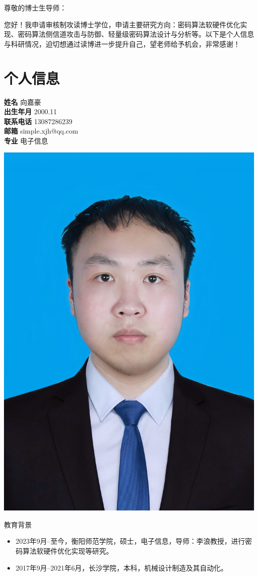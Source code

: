 \documentclass[12pt,a4paper]{article}
\newcommand{\ResumeItem}[2]{\noindent\textbf{#1} \hfill {\small #2}\\}
\begin{document}
{
  \noindent
  尊敬的博士生导师：

  您好！我申请审核制攻读博士学位，申请主要研究方向：密码算法软硬件优化实现、密码算法侧信道攻击与防御、轻量级密码算法设计与分析等。以下是个人信息与科研情况，迫切想通过读博进一步提升自己，望老师给予机会，非常感谢！
  \vspace{1em}
  \normalsize
}

\section*{个人信息}

\begin{center}
  \begin{minipage}[t]{0.63\textwidth}
    \vspace{0pt} %
    \centering
    \ResumeItem{姓名}{向嘉豪}
    \ResumeItem{出生年月}{2000.11}
    \ResumeItem{联系电话}{13087286239}
    \ResumeItem{邮箱}{simple.xjh@qq.com}
    \ResumeItem{专业}{电子信息}
  \end{minipage}%
  \hspace{1em}
  \begin{minipage}[t]{0.33\textwidth}
    \vspace{0pt} %
    \hspace{7em}
    \includegraphics[width=0.35\linewidth]{../image.jpg}
  \end{minipage}
\end{center}

教育背景
\begin{itemize}[leftmargin=2em]
  \item 2023年9月--至今，衡阳师范学院，硕士，电子信息，导师：李浪教授，进行密码算法软硬件优化实现等研究。
  \item 2017年9月--2021年6月，长沙学院，本科，机械设计制造及其自动化。
\end{itemize}
\end{document}
